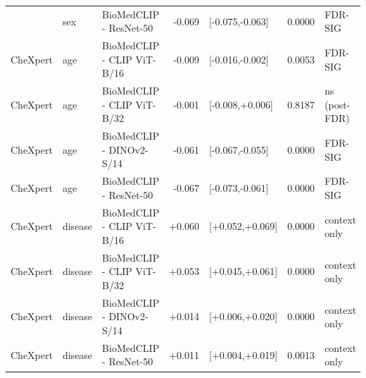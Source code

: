 \begin{table}[t]
\begin{tabular}{lllrlrl}
{    CheXpert & sex & BioMedCLIP - ResNet-50 & -0.069 & [-0.075,-0.063] & 0.0000 & FDR-SIG \\
    CheXpert & age & BioMedCLIP - CLIP ViT-B/16 & -0.009 & [-0.016,-0.002] & 0.0053 & FDR-SIG \\
    CheXpert & age & BioMedCLIP - CLIP ViT-B/32 & -0.001 & [-0.008,+0.006] & 0.8187 & ns (post-FDR) \\
    CheXpert & age & BioMedCLIP - DINOv2-S/14 & -0.061 & [-0.067,-0.055] & 0.0000 & FDR-SIG \\
    CheXpert & age & BioMedCLIP - ResNet-50 & -0.067 & [-0.073,-0.061] & 0.0000 & FDR-SIG \\
    CheXpert & disease & BioMedCLIP - CLIP ViT-B/16 & +0.060 & [+0.052,+0.069] & 0.0000 & context only \\
    CheXpert & disease & BioMedCLIP - CLIP ViT-B/32 & +0.053 & [+0.045,+0.061] & 0.0000 & context only \\
    CheXpert & disease & BioMedCLIP - DINOv2-S/14 & +0.014 & [+0.006,+0.020] & 0.0000 & context only \\
    CheXpert & disease & BioMedCLIP - ResNet-50 & +0.011 & [+0.004,+0.019] & 0.0013 & context only \\
    \bottomrule
  \end{tabular}
\end{table}